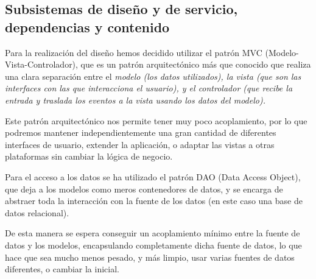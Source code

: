 \subsection{Subsistemas de diseño y de servicio, dependencias y contenido}

Para la realización del diseño hemos decidido utilizar el patrón MVC (Modelo-
Vista-Controlador), que es un patrón arquitectónico más que conocido que realiza
una clara separación entre el \em{modelo} (los datos utilizados), la \em{vista}
(que son las interfaces con las que interacciona el usuario), y el
\em{controlador} (que recibe la entrada y traslada los eventos a la vista usando
los datos del modelo).

Este patrón arquitectónico nos permite tener muy poco acoplamiento, por lo que
podremos mantener independientemente una gran cantidad de diferentes interfaces
de usuario, extender la aplicación, o adaptar las vistas a otras plataformas sin
cambiar la lógica de negocio.

Para el acceso a los datos se ha utilizado el patrón DAO (Data Access Object),
que deja a los modelos como meros contenedores de datos, y se encarga de
abstraer toda la interacción con la fuente de los datos (en este caso una base
de datos relacional).

De esta manera se espera conseguir un acoplamiento mínimo entre la fuente de
datos y los modelos, encapsulando completamente dicha fuente de datos, lo que
hace que sea mucho menos pesado, y más limpio, usar varias fuentes de datos
diferentes, o cambiar la inicial.

